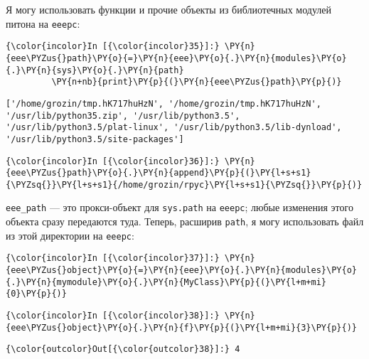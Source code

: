 Я могу использовать функции и прочие объекты из библиотечных модулей
питона на \texttt{eeepc}:

    \begin{Verbatim}[commandchars=\\\{\}]
{\color{incolor}In [{\color{incolor}35}]:} \PY{n}{eee\PYZus{}path}\PY{o}{=}\PY{n}{eee}\PY{o}{.}\PY{n}{modules}\PY{o}{.}\PY{n}{sys}\PY{o}{.}\PY{n}{path}
         \PY{n+nb}{print}\PY{p}{(}\PY{n}{eee\PYZus{}path}\PY{p}{)}
\end{Verbatim}


    \begin{Verbatim}[commandchars=\\\{\}]
['/home/grozin/tmp.hK717huHzN', '/home/grozin/tmp.hK717huHzN', '/usr/lib/python35.zip', '/usr/lib/python3.5', '/usr/lib/python3.5/plat-linux', '/usr/lib/python3.5/lib-dynload', '/usr/lib/python3.5/site-packages']

    \end{Verbatim}

    \begin{Verbatim}[commandchars=\\\{\}]
{\color{incolor}In [{\color{incolor}36}]:} \PY{n}{eee\PYZus{}path}\PY{o}{.}\PY{n}{append}\PY{p}{(}\PY{l+s+s1}{\PYZsq{}}\PY{l+s+s1}{/home/grozin/rpyc}\PY{l+s+s1}{\PYZsq{}}\PY{p}{)}
\end{Verbatim}


    \texttt{eee\_path} --- это прокси-объект для \texttt{sys.path} на
\texttt{eeepc}; любые изменения этого объекта сразу передаются туда.
Теперь, расширив \texttt{path}, я могу использовать файл из этой
директории на \texttt{eeepc}:

    \begin{Verbatim}[commandchars=\\\{\}]
{\color{incolor}In [{\color{incolor}37}]:} \PY{n}{eee\PYZus{}object}\PY{o}{=}\PY{n}{eee}\PY{o}{.}\PY{n}{modules}\PY{o}{.}\PY{n}{mymodule}\PY{o}{.}\PY{n}{MyClass}\PY{p}{(}\PY{l+m+mi}{0}\PY{p}{)}
\end{Verbatim}


    \begin{Verbatim}[commandchars=\\\{\}]
{\color{incolor}In [{\color{incolor}38}]:} \PY{n}{eee\PYZus{}object}\PY{o}{.}\PY{n}{f}\PY{p}{(}\PY{l+m+mi}{3}\PY{p}{)}
\end{Verbatim}


\begin{Verbatim}[commandchars=\\\{\}]
{\color{outcolor}Out[{\color{outcolor}38}]:} 4
\end{Verbatim}
            

